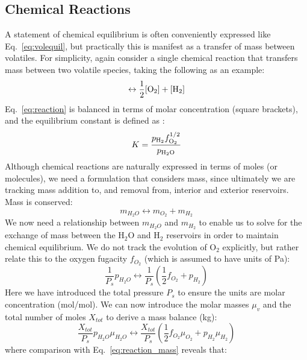 \subsection{Chemical Reactions}
\label{sect:chemreact}
A statement of chemical equilibrium is often conveniently expressed like Eq.~\ref{eq:volequil}, but practically this is manifest as a transfer of mass between volatiles.  For simplicity, again consider a single chemical reaction that transfers mass between two volatile species, taking the following as an example:
\begin{equation}
    [\rm{H}_2O]\leftrightarrow \frac{1}{2} [\rm{O}_2] + [\rm{H}_2]
    \label{eq:reaction}
\end{equation}
Eq.~\ref{eq:reaction} is balanced in terms of molar concentration (square brackets), and the equilibrium constant is defined as \cite[e.g.][]{SF17}:
\begin{equation}
K=\frac{p_{\rm H_2} f_{\rm O_2}^{1/2}}{p_{\rm H_2\rm O}}
\end{equation}
Although chemical reactions are naturally expressed in terms of moles (or molecules), we need a formulation that considers mass, since ultimately we are tracking mass addition to, and removal from, interior and exterior reservoirs.  Mass is conserved:
\begin{equation}
m_{H_2O} \leftrightarrow m_{O_2} + m_{H_2}
\label{eq:reaction_mass}
\end{equation}
We now need a relationship between $m_{H_2O}$ and $m_{H_2}$ to enable us to solve for the exchange of mass between the H$_2$O and H$_2$ reservoirs in order to maintain chemical equilibrium.  We do not track the evolution of O$_2$ explicitly, but rather relate this to the oxygen fugacity $f_{O_2}$ (which is assumed to have units of Pa):
\begin{equation}
    \frac{1}{P_s} p_{H_2O} \leftrightarrow \frac{1}{P_s} \left( \frac{1}{2} f_{O_2} + p_{H_2} \right)
    \label{eq:reactionp}
\end{equation}
Here we have introduced the total pressure $P_s$ to ensure the units are molar concentration (mol/mol).  We can now introduce the molar masses $\mu_v$ and the total number of moles $X_{tot}$ to derive a mass balance (kg):
\begin{equation}
    \frac{X_{tot}}{P_s} p_{H_2O} \mu_{H_2O} \leftrightarrow \frac{X_{tot}}{P_s} \left( \frac{1}{2} f_{O_2} \mu_{O_2} + p_{H_2} \mu_{H_2} \right)
    \label{eq:reaction_mass2}
\end{equation}
where comparison with Eq.~\ref{eq:reaction_mass} reveals that:
